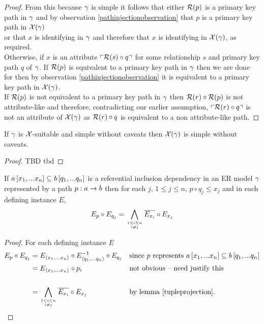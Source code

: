 \begin{proof}
From this because $\gamma$ is simple it follows that either  $\mathcal{R}(p)$ is a primary key path in $\gamma$ and by observation \ref{pathinjectionobservation} that $p$ is a primary key path in $\mathcal{X}(\gamma)$ \\

\noindent or that $x$ is identifying in $\gamma$ and therefore that $x$ is identifying in $\mathcal{X}(\gamma)$, as required.\\

Otherwise, if $x$ is an attribute $\left\ulcorner \mathcal{R}(s) \circ q\right\urcorner$ for some relationship $s$ and primary key path $q$ of $\gamma$. If $\mathcal{R}(p)$ is equivalent to a primary key path in $\gamma$
then we are done for then by observation \ref{pathinjectionobservation} it is equivalent to a primary key path in $\mathcal{X}(\gamma)$. \\


\noindent If $\mathcal{R}(p)$ is not equivalent to a primary key path in $\gamma$ then $\mathcal{R}(r) \circ \mathcal{R}(p)$ 
is not attribute-like  and therefore, contradicting our earlier assumption,  $\left\ulcorner \mathcal{R}(r) \circ q\right\urcorner$ is not an attribute of $\mathcal{X}(\gamma)$
as $\mathcal{R}(r) \circ q$ is equivalent to a non attribute-like path.
\end{proof}

\begin{lemma}
If $\gamma$ is $\mathcal{X}$-suitable and simple without caveats then $\mathcal{X}(\gamma)$ is simple without caveats.
\end{lemma}
\begin{proof}
TBD
\vspace{0.5cm}
tbd
\end{proof}


\begin{lemma}
If $a\left[x_1,...x_n\right]\subseteq b\left[q_1,...q_n\right]$ is a referential inclusion dependency in an ER model $\gamma$ 
represented by a path $p:a \rightarrow b$ then for each $j$, $1 \leq j \leq n$, $p \circ q_j \leq x_j$
and in each defining instance $E$,
$$E_p \circ E_{q_j} = \bigwedge\limits_{\genfrac{}{}{0pt}{}{1 \leq i \leq n}{ i \neq j}}{\overline{E_{x_i}}}\circ E_{x_j}$$
\end{lemma}
\begin{proof}
For each defining instance $E$
\begin{align*}
E_p \circ E_{q_j} &=  E_{\xntuple} \circ E ^{-1}_{\qntuple} \circ E_{q_j}  && \mbox{since $p$ represents $\incd{a}{x_1,...x_n}{b}{q_1,...q_n}$} \\
                  &= E_{\xntuple} \circ p_i                              && \mbox{not obvious -- need justify this} \\                                                                 \\
									&= \bigwedge\limits_{\genfrac{}{}{0pt}{}{1 \leq i \leq n}{ i \neq j}}{\overline{E_{x_i}}}\circ E_{x_j} && \mbox{by lemma \ref{tupleprojection}.}
\end{align*}
\end{proof}

